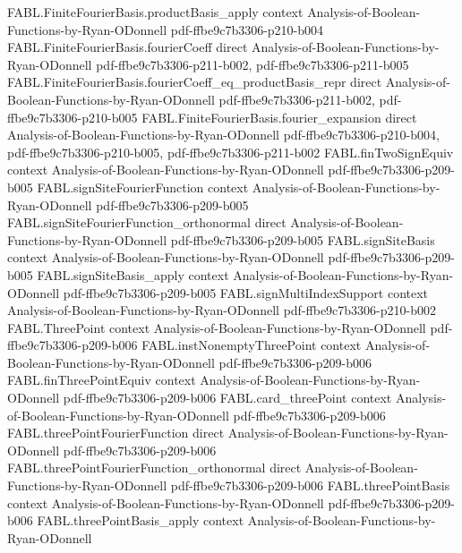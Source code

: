 \begin{theorem}
\proofstep
  {FABL.FiniteFourierBasis.productBasis_apply}
  {context}
  {Analysis-of-Boolean-Functions-by-Ryan-ODonnell}
  {pdf-ffbe9c7b3306-p210-b004}
\proofstep
  {FABL.FiniteFourierBasis.fourierCoeff}
  {direct}
  {Analysis-of-Boolean-Functions-by-Ryan-ODonnell}
  {pdf-ffbe9c7b3306-p211-b002,
    pdf-ffbe9c7b3306-p211-b005}
\proofstep
  {FABL.FiniteFourierBasis.fourierCoeff_eq_productBasis_repr}
  {direct}
  {Analysis-of-Boolean-Functions-by-Ryan-ODonnell}
  {pdf-ffbe9c7b3306-p211-b002,
    pdf-ffbe9c7b3306-p210-b005}
\proofstep
  {FABL.FiniteFourierBasis.fourier_expansion}
  {direct}
  {Analysis-of-Boolean-Functions-by-Ryan-ODonnell}
  {pdf-ffbe9c7b3306-p210-b004,
    pdf-ffbe9c7b3306-p210-b005,
    pdf-ffbe9c7b3306-p211-b002}
\proofstep
  {FABL.finTwoSignEquiv}
  {context}
  {Analysis-of-Boolean-Functions-by-Ryan-ODonnell}
  {pdf-ffbe9c7b3306-p209-b005}
\proofstep
  {FABL.signSiteFourierFunction}
  {context}
  {Analysis-of-Boolean-Functions-by-Ryan-ODonnell}
  {pdf-ffbe9c7b3306-p209-b005}
\proofstep
  {FABL.signSiteFourierFunction_orthonormal}
  {direct}
  {Analysis-of-Boolean-Functions-by-Ryan-ODonnell}
  {pdf-ffbe9c7b3306-p209-b005}
\proofstep
  {FABL.signSiteBasis}
  {context}
  {Analysis-of-Boolean-Functions-by-Ryan-ODonnell}
  {pdf-ffbe9c7b3306-p209-b005}
\proofstep
  {FABL.signSiteBasis_apply}
  {context}
  {Analysis-of-Boolean-Functions-by-Ryan-ODonnell}
  {pdf-ffbe9c7b3306-p209-b005}
\proofstep
  {FABL.signMultiIndexSupport}
  {context}
  {Analysis-of-Boolean-Functions-by-Ryan-ODonnell}
  {pdf-ffbe9c7b3306-p210-b002}
\proofstep
  {FABL.ThreePoint}
  {context}
  {Analysis-of-Boolean-Functions-by-Ryan-ODonnell}
  {pdf-ffbe9c7b3306-p209-b006}
\proofstep
  {FABL.instNonemptyThreePoint}
  {context}
  {Analysis-of-Boolean-Functions-by-Ryan-ODonnell}
  {pdf-ffbe9c7b3306-p209-b006}
\proofstep
  {FABL.finThreePointEquiv}
  {context}
  {Analysis-of-Boolean-Functions-by-Ryan-ODonnell}
  {pdf-ffbe9c7b3306-p209-b006}
\proofstep
  {FABL.card_threePoint}
  {context}
  {Analysis-of-Boolean-Functions-by-Ryan-ODonnell}
  {pdf-ffbe9c7b3306-p209-b006}
\proofstep
  {FABL.threePointFourierFunction}
  {direct}
  {Analysis-of-Boolean-Functions-by-Ryan-ODonnell}
  {pdf-ffbe9c7b3306-p209-b006}
\proofstep
  {FABL.threePointFourierFunction_orthonormal}
  {direct}
  {Analysis-of-Boolean-Functions-by-Ryan-ODonnell}
  {pdf-ffbe9c7b3306-p209-b006}
\proofstep
  {FABL.threePointBasis}
  {context}
  {Analysis-of-Boolean-Functions-by-Ryan-ODonnell}
  {pdf-ffbe9c7b3306-p209-b006}
\proofstep
  {FABL.threePointBasis_apply}
  {context}
  {Analysis-of-Boolean-Functions-by-Ryan-ODonnell}

\end{theorem}
